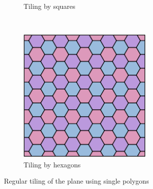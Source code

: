 \documentclass[]{article}
\begin{document}
\begin{figure}
\begin{subfigure}[hb]{0.3\textwidth}
                \caption{Tiling by squares}
                \label{fig:square}
        \end{subfigure}
        ~ %
        \begin{subfigure}[hb]{0.3\textwidth}
                \includegraphics[width=\textwidth]{hexagon}
                \caption{Tiling by hexagons}
                \label{fig:hexagon}
        \end{subfigure}
        \caption{Regular tiling of the plane using single polygons}\label{fig:regular}
\end{figure}
\end{document}
